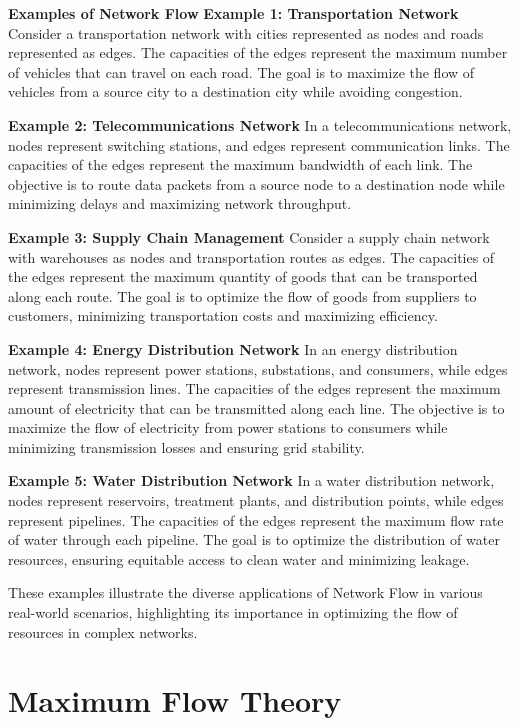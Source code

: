 \documentclass[12pt]{book} %
\begin{document}
\textbf{Examples of Network Flow}
\textbf{Example 1: Transportation Network}
Consider a transportation network with cities represented as nodes and roads represented as edges. The capacities of the edges represent the maximum number of vehicles that can travel on each road. The goal is to maximize the flow of vehicles from a source city to a destination city while avoiding congestion.

\textbf{Example 2: Telecommunications Network}
In a telecommunications network, nodes represent switching stations, and edges represent communication links. The capacities of the edges represent the maximum bandwidth of each link. The objective is to route data packets from a source node to a destination node while minimizing delays and maximizing network throughput.

\textbf{Example 3: Supply Chain Management}
Consider a supply chain network with warehouses as nodes and transportation routes as edges. The capacities of the edges represent the maximum quantity of goods that can be transported along each route. The goal is to optimize the flow of goods from suppliers to customers, minimizing transportation costs and maximizing efficiency.

\textbf{Example 4: Energy Distribution Network}
In an energy distribution network, nodes represent power stations, substations, and consumers, while edges represent transmission lines. The capacities of the edges represent the maximum amount of electricity that can be transmitted along each line. The objective is to maximize the flow of electricity from power stations to consumers while minimizing transmission losses and ensuring grid stability.

\textbf{Example 5: Water Distribution Network}
In a water distribution network, nodes represent reservoirs, treatment plants, and distribution points, while edges represent pipelines. The capacities of the edges represent the maximum flow rate of water through each pipeline. The goal is to optimize the distribution of water resources, ensuring equitable access to clean water and minimizing leakage.

These examples illustrate the diverse applications of Network Flow in various real-world scenarios, highlighting its importance in optimizing the flow of resources in complex networks.


\section{Maximum Flow Theory}
\end{document}
